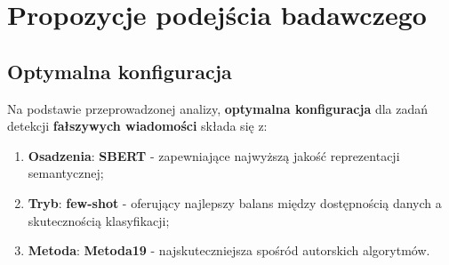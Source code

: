\section{Propozycje podejścia badawczego}
\subsection{Optymalna konfiguracja}
Na podstawie przeprowadzonej analizy, \textbf{optymalna konfiguracja} dla zadań detekcji \textbf{fałszywych wiadomości} składa się z:
\begin{enumerate}
	\item \textbf{Osadzenia}: \textbf{SBERT} - zapewniające najwyższą jakość reprezentacji semantycznej;
	\item \textbf{Tryb}: \textbf{few-shot} - oferujący najlepszy balans między dostępnością danych a skutecznością klasyfikacji;
	\item \textbf{Metoda}: \textbf{Metoda19} - najskuteczniejsza spośród autorskich algorytmów.
\end{enumerate}

